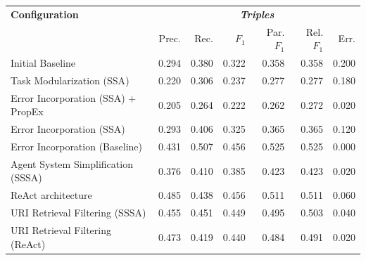 \documentclass[a4paper,oneside,bibliography=totoc]{scrbook}
\begin{document}
\begin{table}[h]
  \centering
  \begin{tabular}{p{5cm}|rrrrrr}
    \toprule
    \textbf{Configuration}                       & \multicolumn{6}{c}{\textit{\textbf{Triples}}}                                                                                      \\
                                                 & Prec.                                         & Rec.           & $F_1$          & Par. $F_1$     & Rel. $F_1$     & Err.           \\
    \midrule
    Initial Baseline                             & 0.294                                         & 0.380          & 0.322          & 0.358          & 0.358          & 0.200          \\
    Task Modularization (\ac{SSA})               & 0.220                                         & 0.306          & 0.237          & 0.277          & 0.277          & 0.180          \\
    Error Incorporation (\ac{SSA}) + \ac{PropEx} & 0.205                                         & 0.264          & 0.222          & 0.262          & 0.272          & 0.020          \\
    Error Incorporation (\ac{SSA})               & 0.293                                         & 0.406          & 0.325          & 0.365          & 0.365          & 0.120          \\
    Error Incorporation (Baseline)               & 0.431                                         & 0.507          & 0.456          & 0.525          & 0.525          & 0.000          \\
    Agent System Simplification (\ac{SSSA})      & 0.376                                         & 0.410          & 0.385          & 0.423          & 0.423          & 0.020          \\
    ReAct architecture                           & 0.485                                         & 0.438          & 0.456          & 0.511          & 0.511          & 0.060          \\
    URI Retrieval Filtering (\ac{SSSA})          & 0.455                                         & 0.451          & 0.449          & 0.495          & 0.503          & 0.040          \\
    URI Retrieval Filtering (ReAct)              & 0.473                                         & 0.419          & 0.440          & 0.484          & 0.491          & 0.020          \\

\end{tabular}
\end{table}
\end{document}
